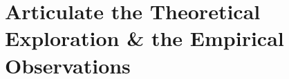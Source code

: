 \documentclass[a4paper]{article}
\begin{document}
\section{ Articulate the Theoretical Exploration \& the Empirical Observations}
%
%
%
%
%	
%
%
\end{document}
